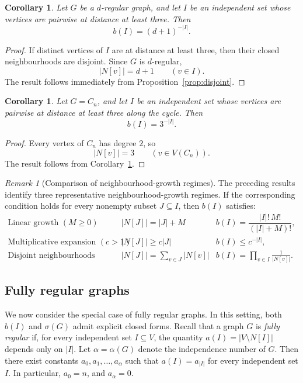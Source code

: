 \documentclass[11pt,a4paper]{article}
\numberwithin{equation}{section}
\theoremstyle{plain}
\newtheorem{corollary}[theorem]{Corollary}
\theoremstyle{definition}
\theoremstyle{remark}
\newtheorem{remark}[theorem]{Remark}
\begin{document}
\begin{corollary}
\label{cor:dregular}
Let \(G\) be a \(d\)-regular graph, and let \(I\) be an independent set whose vertices are pairwise at distance at least three. Then
\[
b(I)=(d+1)^{-|I|}.
\]
\end{corollary}

\begin{proof}
If distinct vertices of \(I\) are at distance at least three, then their closed neighbourhoods are disjoint. Since \(G\) is \(d\)-regular,
\[
|N[v]|=d+1
\qquad
(v\in I).
\]
The result follows immediately from Proposition~\ref{prop:disjoint}.
\end{proof}

\begin{corollary}
\label{cor:cycle_exact}
Let \(G=C_n\), and let \(I\) be an independent set whose vertices are pairwise at distance at least three along the cycle. Then
\[
b(I)=3^{-|I|}.
\]
\end{corollary}

\begin{proof}
Every vertex of \(C_n\) has degree \(2\), so
\[
|N[v]|=3
\qquad
(v\in V(C_n)).
\]
The result follows from Corollary~\ref{cor:dregular}.
\end{proof}

\begin{remark}[Comparison of neighbourhood-growth regimes]
The preceding results identify three representative neighbourhood-growth regimes. If the corresponding condition holds for every nonempty subset \(J\subseteq I\), then \(b(I)\) satisfies:
\[
\begin{array}{lll}
\text{Linear growth }(M\ge0)
&
|N[J]|=|J|+M
&
b(I)=\dfrac{|I|!\,M!}{(|I|+M)!},
\\[1.5ex]
\text{Multiplicative expansion }(c>1)
&
|N[J]|\ge c|J|
&
b(I)\le c^{-|I|},
\\[1.5ex]
\text{Disjoint neighbourhoods}
&
|N[J]|=\displaystyle\sum_{v\in J}|N[v]|
&
b(I)=\displaystyle\prod_{v\in I}\frac1{|N[v]|}.
\end{array}
\]
\end{remark}


\subsection{Fully regular graphs} \label{subsec:fully_regular} 

We now consider the special case of fully regular graphs. In this setting, both \(b(I)\) and \(\sigma(G)\) admit explicit closed forms.
Recall that a graph \(G\) is \emph{fully regular} if, for every independent set \(I\subseteq V\), the quantity
\(
a(I)=|V\setminus N[I]|
\)
depends only on \(|I|\). Let \(\alpha=\alpha(G)\) denote the independence number of \(G\). Then there exist constants
\(
a_0,a_1,\dots,a_\alpha
\)
such that
\(
a(I)=a_{|I|}
\)
for every independent set \(I\). In particular, \(a_0=n\), and \(a_\alpha=0\).
\end{document}
